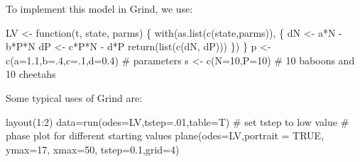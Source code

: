 \documentclass[
  a4paper,
  DIV=11,
  numbers=noendperiod,
  oneside]{scrreprt}
\newenvironment{Shaded}{\begin{snugshade}}{\end{snugshade}}
\newcommand{\AttributeTok}[1]{\textcolor[rgb]{0.40,0.45,0.13}{#1}}
\newcommand{\CommentTok}[1]{\textcolor[rgb]{0.37,0.37,0.37}{#1}}
\newcommand{\ConstantTok}[1]{\textcolor[rgb]{0.56,0.35,0.01}{#1}}
\newcommand{\ControlFlowTok}[1]{\textcolor[rgb]{0.00,0.23,0.31}{#1}}
\newcommand{\DecValTok}[1]{\textcolor[rgb]{0.68,0.00,0.00}{#1}}
\newcommand{\FloatTok}[1]{\textcolor[rgb]{0.68,0.00,0.00}{#1}}
\newcommand{\FunctionTok}[1]{\textcolor[rgb]{0.28,0.35,0.67}{#1}}
\newcommand{\NormalTok}[1]{\textcolor[rgb]{0.00,0.23,0.31}{#1}}
\newcommand{\OtherTok}[1]{\textcolor[rgb]{0.00,0.23,0.31}{#1}}
\newcommand{\SpecialCharTok}[1]{\textcolor[rgb]{0.37,0.37,0.37}{#1}}
\begin{document}
To implement this model in Grind, we use:

\begin{Shaded}
\begin{Highlighting}[]
\NormalTok{LV }\OtherTok{\textless{}{-}} \ControlFlowTok{function}\NormalTok{(t, state, parms) \{}
  \FunctionTok{with}\NormalTok{(}\FunctionTok{as.list}\NormalTok{(}\FunctionTok{c}\NormalTok{(state,parms)), \{}
\NormalTok{    dN }\OtherTok{\textless{}{-}}\NormalTok{ a}\SpecialCharTok{*}\NormalTok{N }\SpecialCharTok{{-}}\NormalTok{ b}\SpecialCharTok{*}\NormalTok{P}\SpecialCharTok{*}\NormalTok{N}
\NormalTok{    dP }\OtherTok{\textless{}{-}}\NormalTok{ c}\SpecialCharTok{*}\NormalTok{P}\SpecialCharTok{*}\NormalTok{N }\SpecialCharTok{{-}}\NormalTok{ d}\SpecialCharTok{*}\NormalTok{P}
    \FunctionTok{return}\NormalTok{(}\FunctionTok{list}\NormalTok{(}\FunctionTok{c}\NormalTok{(dN, dP)))}
\NormalTok{  \})}
\NormalTok{\}}
\NormalTok{p }\OtherTok{\textless{}{-}} \FunctionTok{c}\NormalTok{(}\AttributeTok{a=}\FloatTok{1.1}\NormalTok{,}\AttributeTok{b=}\NormalTok{.}\DecValTok{4}\NormalTok{,}\AttributeTok{c=}\NormalTok{.}\DecValTok{1}\NormalTok{,}\AttributeTok{d=}\FloatTok{0.4}\NormalTok{) }\CommentTok{\# parameters}
\NormalTok{s }\OtherTok{\textless{}{-}} \FunctionTok{c}\NormalTok{(}\AttributeTok{N=}\DecValTok{10}\NormalTok{,}\AttributeTok{P=}\DecValTok{10}\NormalTok{)             }\CommentTok{\# 10 baboons and 10 cheetahs}
\end{Highlighting}
\end{Shaded}

Some typical uses of Grind are:

\begin{Shaded}
\begin{Highlighting}[]
\FunctionTok{layout}\NormalTok{(}\DecValTok{1}\SpecialCharTok{:}\DecValTok{2}\NormalTok{)}
\NormalTok{data}\OtherTok{=}\FunctionTok{run}\NormalTok{(}\AttributeTok{odes=}\NormalTok{LV,}\AttributeTok{tstep=}\NormalTok{.}\DecValTok{01}\NormalTok{,}\AttributeTok{table=}\NormalTok{T) }\CommentTok{\# set tstep to low value}
\CommentTok{\# phase plot for different starting values}
\FunctionTok{plane}\NormalTok{(}\AttributeTok{odes=}\NormalTok{LV,}\AttributeTok{portrait =} \ConstantTok{TRUE}\NormalTok{, }\AttributeTok{ymax=}\DecValTok{17}\NormalTok{, }\AttributeTok{xmax=}\DecValTok{50}\NormalTok{, }\AttributeTok{tstep=}\FloatTok{0.1}\NormalTok{,}\AttributeTok{grid=}\DecValTok{4}\NormalTok{)}
\end{Highlighting}
\end{Shaded}
\end{document}
